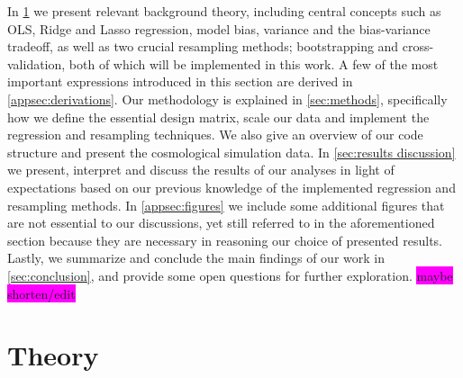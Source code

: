 \documentclass[aps,pra,english,notitlepage,reprint,nofootinbib]{revtex4-1}  %
\begin{document}
In \cref{sec:theory} we present relevant background theory, including central concepts such as OLS, Ridge and Lasso regression, model bias, variance and the bias-variance tradeoff, as well as two crucial resampling methods; bootstrapping and cross-validation, both of which will be implemented in this work. A few of the most important expressions introduced in this section are derived in \cref{appsec:derivations}. Our methodology is explained in \cref{sec:methods}, specifically how we define the essential design matrix, scale our data and implement the regression and resampling techniques. We also give an overview of our code structure and present the cosmological simulation data. In \cref{sec:results discussion} we present, interpret and discuss the results of our analyses in light of expectations based on our previous knowledge of the implemented regression and resampling methods. In \cref{appsec:figures} we include some additional figures that are not essential to our discussions, yet still referred to in the aforementioned section because they are necessary in reasoning our choice of presented results. Lastly, we summarize and conclude the main findings of our work in \cref{sec:conclusion}, and provide some open questions for further exploration. \colorbox{magenta}{maybe shorten/edit} 

\section{Theory}\label{sec:theory}

\end{document}
